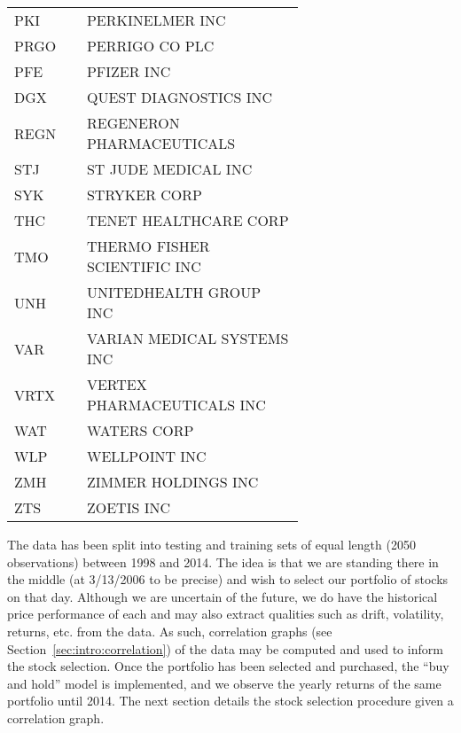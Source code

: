 \begin{longtable}{p{0.15\linewidth} p{0.5\linewidth}}
	PKI & PERKINELMER INC \\
	PRGO & PERRIGO CO PLC \\
	PFE & PFIZER INC \\
	DGX & QUEST DIAGNOSTICS INC \\
	REGN & REGENERON PHARMACEUTICALS \\
	STJ & ST JUDE MEDICAL INC \\
	SYK & STRYKER CORP \\
	THC & TENET HEALTHCARE CORP \\
	TMO & THERMO FISHER SCIENTIFIC INC \\
	UNH & UNITEDHEALTH GROUP INC \\
	VAR & VARIAN MEDICAL SYSTEMS INC \\
	VRTX & VERTEX PHARMACEUTICALS INC \\
	WAT & WATERS CORP \\
	WLP & WELLPOINT INC \\
	ZMH & ZIMMER HOLDINGS INC \\
	ZTS & ZOETIS INC \\
	
\end{longtable}
\bodyspacing

The data has been split into testing and training sets of equal length (2050 
observations) between 1998 and 2014. The idea is that we are standing there in 
the middle (at 3/13/2006 to be precise) and wish to select our portfolio of 
stocks on that day. Although we are uncertain of the future, we do have the 
historical price performance of each and may also extract qualities such as 
drift, volatility, returns, etc. from the data. As such, correlation graphs 
(see Section~\ref{sec:intro:correlation}) of the data may be computed and used 
to inform the stock selection. Once the portfolio has been 
selected and purchased, the ``buy and hold'' model is implemented, and we 
observe the yearly returns of the same portfolio until 2014. The next section  
details the stock selection procedure given a correlation graph.
